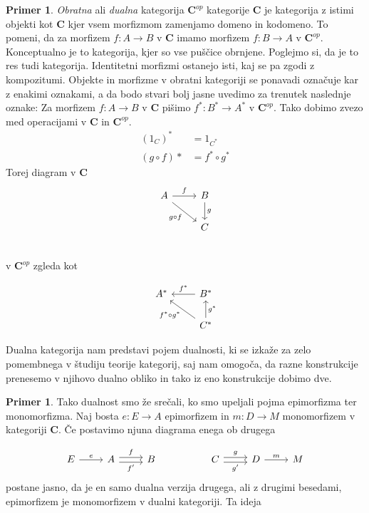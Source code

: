 \documentclass[12pt,a4paper]{book}
\theoremstyle{definition}
\theoremstyle{plain}
\theoremstyle{definition}
\newtheorem{primer}{Primer}[section]
\newtheorem*{primer*}{Primer}
\theoremstyle{remark}
\newcommand{\cat}[1]{\textbf{#1}}
\begin{document}
\begin{primer}
\textit{Obratna} ali \textit{dualna} kategorija $\cat{C}^{op}$ kategorije $\cat{C}$ je kategorija z istimi objekti kot $\cat{C}$ kjer vsem morfizmom zamenjamo domeno in kodomeno. To pomeni, da za morfizem $f : A \to B$ v $\cat{C}$ imamo morfizem $f : B \to A$ v $\cat{C}^{op}$. Konceptualno je to kategorija, kjer so vse puščice obrnjene. Poglejmo si, da je to res tudi kategorija. Identitetni morfizmi ostanejo isti, kaj se pa zgodi z kompozitumi. Objekte in morfizme v obratni kategoriji se ponavadi označuje kar z enakimi oznakami, a da bodo stvari bolj jasne uvedimo za trenutek naslednje oznake: Za morfizem $f : A \to B$ v $\cat{C}$ pišimo $f^* : B^* \to A^*$ v $\cat{C}^{op}$. Tako dobimo zvezo med operacijami v $\cat{C}$ in $\cat{C}^{op}$.
\begin{align*}
(1_C)^* &= 1_{C^*} \\
(g \circ f)* &= f^* \circ g^*
\end{align*}
Torej diagram v $\cat{C}$
\[ \begin{tikzcd}
A \arrow[r, "f"] \arrow[rd, "g \circ f"'] & B \arrow[d, "g"] \\
&	C \\
\end{tikzcd} \]
v $\cat{C}^{op}$ zgleda kot

\[ \begin{tikzcd}
A^* & \arrow[l, "f^*"'] B^* \\
& \arrow[lu, "f^* \circ g^*"] C^* \arrow[u, "g^*"']
\end{tikzcd} \]

Dualna kategorija nam predstavi pojem dualnosti, ki se izkaže za zelo pomembnega v študiju teorije kategorij, saj nam omogoča, da razne konstrukcije prenesemo v njihovo dualno obliko in tako iz eno konstrukcije dobimo dve. 
\begin{primer*}
Tako dualnost smo že srečali, ko smo upeljali pojma epimorfizma ter monomorfizma. Naj bosta $e : E \to A$ epimorfizem in $m : D \to M$ monomorfizem v kategoriji $\cat{C}$. Če postavimo njuna diagrama enega ob drugega

\[ \begin{tikzcd}
E \ar[r, "e"] & A \ar[r, shift left, "f"] \ar[r, shift right, "f'"'] & B & & C \ar[r, shift left, "g"] \ar[r, shift right, "g'"'] & D \ar[r, "m"] & M
\end{tikzcd} \]
postane jasno, da je en samo dualna verzija drugega, ali z drugimi besedami, epimorfizem je monomorfizem v dualni kategoriji. Ta ideja 


\end{primer*}

\end{primer}
\end{document}
